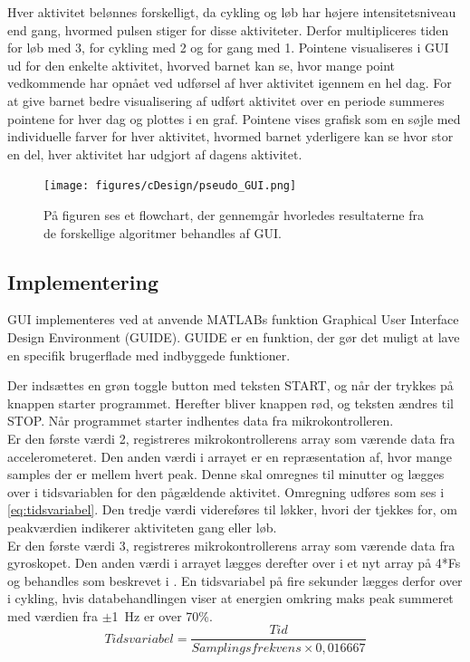Hver aktivitet belønnes forskelligt, da cykling og løb har højere intensitetsniveau end gang, hvormed pulsen stiger for disse aktiviteter. Derfor multipliceres tiden for løb med 3, for cykling med 2 og for gang med 1. Pointene visualiseres i GUI ud for den enkelte aktivitet, hvorved barnet kan se, hvor mange point vedkommende har opnået ved udførsel af hver aktivitet igennem en hel dag. For at give barnet bedre visualisering af udført aktivitet over en periode summeres pointene for hver dag og plottes i en graf. Pointene vises grafisk som en søjle med individuelle farver for hver aktivitet, hvormed barnet yderligere kan se hvor stor en del, hver aktivitet har udgjort af dagens aktivitet.  
\begin{figure}[H]
	\centering
	\texttt{[image: figures/cDesign/pseudo\_GUI.png]}
	\caption{På figuren ses et flowchart, der gennemgår hvorledes resultaterne fra de forskellige algoritmer behandles af GUI.}
	\label{fig:GUI}
\end{figure}

\subsection{Implementering}
GUI implementeres ved at anvende MATLABs funktion Graphical User Interface Design Environment (GUIDE). GUIDE er en funktion, der gør det muligt at lave en specifik brugerflade med indbyggede funktioner.

Der indsættes en grøn toggle button med teksten START, og når der trykkes på knappen starter programmet. Herefter bliver knappen rød, og teksten ændres til STOP. Når programmet starter indhentes data fra mikrokontrolleren. \\
Er den første værdi 2, registreres mikrokontrollerens array som værende data fra accelerometeret. Den anden værdi i arrayet er en repræsentation af, hvor mange samples der er mellem hvert peak. Denne skal omregnes til minutter og lægges over i tidsvariablen for den pågældende aktivitet. Omregning udføres som ses i \eqref{eq:tidsvariabel}. Den tredje værdi videreføres til løkker, hvori der tjekkes for, om peakværdien indikerer aktiviteten gang eller løb. \\
Er den første værdi 3, registreres mikrokontrollerens array som værende data fra gyroskopet. Den anden værdi i arrayet lægges derefter over i et nyt array på 4*Fs og behandles som beskrevet i . En tidsvariabel på fire sekunder lægges derfor over i cykling, hvis databehandlingen viser at energien omkring maks peak summeret med værdien fra $\pm$1~Hz er over 70\%. 
\begin{equation}
Tidsvariabel = \frac{Tid}{Samplingsfrekvens \times 0,016667}
\label{eq:tidsvariabel}
\end{equation}

